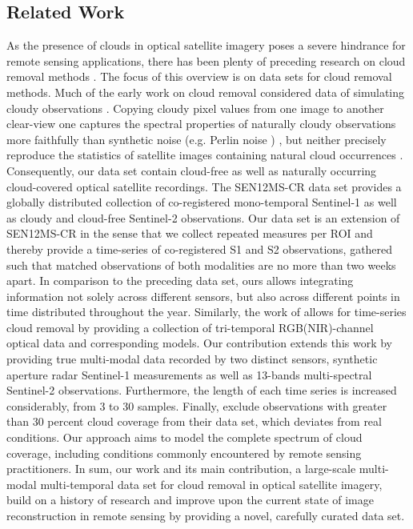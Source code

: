 \documentclass[journal]{IEEEtran}
\begin{document}
\subsection{Related Work} As the presence of clouds in optical satellite imagery poses a severe hindrance for remote sensing applications, there has been plenty of preceding research on cloud removal methods \cite{Enomoto_Sakurada_Wang_Fukui_Matsuoka_Nakamura_Kawaguchi_2017, Grohnfeldt_Schmitt_Zhu_2018, Singh_Komodakis_2018, sintarasirikulchai2018multi, Bermudez_Happ_Feitosa_Oliveira_2019, Rafique_Blanton_Jacobs, Sarukkai_Jain_Uzkent_Ermon_2019, meraner2020cloud, ebel2020multisensor}. The focus of this overview is on data sets for cloud removal methods. Much of the early work on cloud removal considered data of simulating cloudy observations \cite{Rafique_Blanton_Jacobs}. Copying cloudy pixel values from one image to another clear-view one \cite{Rafique_Blanton_Jacobs} captures the spectral properties of naturally cloudy observations more faithfully than synthetic noise (e.g. Perlin noise \cite{Perlin}) \cite{Enomoto_Sakurada_Wang_Fukui_Matsuoka_Nakamura_Kawaguchi_2017, Grohnfeldt_Schmitt_Zhu_2018, sintarasirikulchai2018multi}, but neither precisely reproduce the statistics of satellite images containing natural cloud occurrences \cite{ebel2020multisensor}. 
Consequently, our data set contain cloud-free as well as naturally occurring cloud-covered optical satellite recordings. The SEN12MS-CR data set \cite{ebel2020multisensor} provides a globally distributed collection of co-registered mono-temporal Sentinel-1 as well as cloudy and cloud-free Sentinel-2 observations. Our data set is an extension of SEN12MS-CR in the sense that we collect repeated measures per ROI and thereby provide a time-series of co-registered S1 and S2 observations, gathered such that matched observations of both modalities are no more than two weeks apart. In comparison to the preceding data set, ours allows integrating information not solely across different sensors, but also across different points in time distributed throughout the year. Similarly, the work of \cite{Sarukkai_Jain_Uzkent_Ermon_2019} allows for time-series cloud removal by providing a collection of tri-temporal RGB(NIR)-channel optical data and corresponding models. Our contribution extends this work by providing true multi-modal data recorded by two distinct sensors, synthetic aperture radar Sentinel-1 measurements as well as 13-bands multi-spectral Sentinel-2 observations. Furthermore, the length of each time series is increased considerably, from 3 to 30 samples. Finally, \cite{Sarukkai_Jain_Uzkent_Ermon_2019} exclude observations with greater than $30$ percent cloud coverage from their data set, which deviates from real conditions. Our approach aims to model the complete spectrum of cloud coverage, including conditions commonly encountered by remote sensing practitioners. In sum, our work and its main contribution, a large-scale multi-modal multi-temporal data set for cloud removal in optical satellite imagery, build on a history of research and improve upon the current state of image reconstruction in remote sensing by providing a novel, carefully curated data set. 
\end{document}
